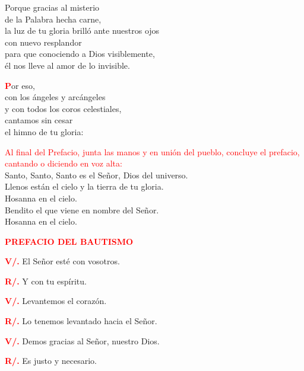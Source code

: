 \documentclass[12pt, letterpaper, spanish]{article}
\begin{document}
  \noindent
  \Large Porque gracias al misterio\\
      de la Palabra hecha carne,\\
      la luz de tu gloria brill\'o ante nuestros ojos\\
      con nuevo resplandor\\
      para que conociendo a Dios visiblemente,\\
      \'el nos lleve al amor de lo invisible.

  \lettrine[lines=2]{\bfseries \textcolor{red}{P}}{}\Large or eso,\\
      con los \'angeles y arc\'angeles\\
      y con todos los coros celestiales,\\
      cantamos sin cesar\\
      el himno de tu gloria:

  \large{\textcolor{red}{Al final del Prefacio, junta las manos y en uni\'on del pueblo, concluye el prefacio, cantando o diciendo en voz alta:}}\\
  \Large {Santo, Santo, Santo es el Se\~nor, Dios del universo.\\
  Llenos est\'an el cielo y la tierra de tu gloria.\\
  Hosanna en el cielo.\\
  Bendito el que viene en nombre del Se\~nor.\\
  Hosanna en el cielo.}

  \clearpage

  \Large {\bfseries \textcolor{red}{PREFACIO DEL BAUTISMO}} 

  \Large {\bfseries \textcolor{red}{V/.}} \hspace{0.5cm} El Se\~nor est\'e con vosotros.

  \Large {\bfseries \textcolor{red}{R/.}} \hspace{0.5cm} Y con tu esp\'iritu. 

  \Large {\bfseries \textcolor{red}{V/.}} \hspace{0.5cm} Levantemos el coraz\'on.

  \Large {\bfseries \textcolor{red}{R/.}} \hspace{0.5cm} Lo tenemos levantado hacia el Se\~nor. 

  \Large {\bfseries \textcolor{red}{V/.}} \hspace{0.5cm} Demos gracias al Se\~nor, nuestro Dios.

  \Large {\bfseries \textcolor{red}{R/.}} \hspace{0.5cm} Es justo y necesario.
\end{document}
